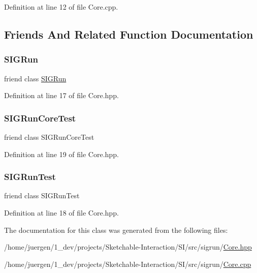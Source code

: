 Definition at line 12 of file Core.\+cpp.



\subsection{Friends And Related Function Documentation}
\mbox{\label{class_core_a5f9132838c20db918d2592c4c0f0dcbb}} 
\subsubsection{\texorpdfstring{SIGRun}{SIGRun}}
{\footnotesize\ttfamily friend class \mbox{\hyperlink{class_s_i_g_run}{S\+I\+G\+Run}}\hspace{0.3cm}{\ttfamily [friend]}}



Definition at line 17 of file Core.\+hpp.

\mbox{\label{class_core_a0428dbcb31e2aacead72907324826035}} 
\subsubsection{\texorpdfstring{SIGRunCoreTest}{SIGRunCoreTest}}
{\footnotesize\ttfamily friend class S\+I\+G\+Run\+Core\+Test\hspace{0.3cm}{\ttfamily [friend]}}



Definition at line 19 of file Core.\+hpp.

\mbox{\label{class_core_a703c4760c08c6e9065d8bd71b05c3d63}} 
\subsubsection{\texorpdfstring{SIGRunTest}{SIGRunTest}}
{\footnotesize\ttfamily friend class S\+I\+G\+Run\+Test\hspace{0.3cm}{\ttfamily [friend]}}



Definition at line 18 of file Core.\+hpp.



The documentation for this class was generated from the following files\+:\begin{DoxyCompactItemize}
\item 
/home/juergen/1\+\_\+dev/projects/\+Sketchable-\/\+Interaction/\+S\+I/src/sigrun/\mbox{\hyperlink{_core_8hpp}{Core.\+hpp}}\item 
/home/juergen/1\+\_\+dev/projects/\+Sketchable-\/\+Interaction/\+S\+I/src/sigrun/\mbox{\hyperlink{_core_8cpp}{Core.\+cpp}}\end{DoxyCompactItemize}
